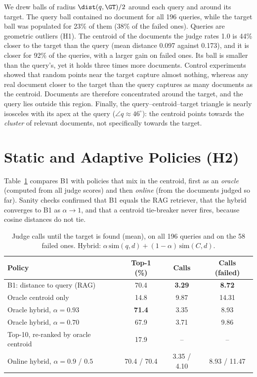 We drew balls of radius $\dist(q,\GT)/2$ around each query and around its target. The query ball contained no document for all 196 queries, while the target ball was populated for 23\% of them (38\% of the failed ones). Queries are geometric outliers (H1). The centroid of the documents the judge rates 1.0 is 44\% closer to the target than the query (mean distance 0.097 against 0.173), and it is closer for 92\% of the queries, with a larger gain on failed ones. Its ball is smaller than the query's, yet it holds three times more documents. Control experiments showed that random points near the target capture almost nothing, whereas any real document closer to the target than the query captures as many documents as the centroid. Documents are therefore concentrated around the target, and the query lies outside this region. Finally, the query--centroid--target triangle is nearly isosceles with its apex at the query ($\angle q\approx46^{\circ}$): the centroid points towards the \emph{cluster} of relevant documents, not specifically towards the target.

\section{Static and Adaptive Policies (H2)}
\label{sec:prelim-policies}

Table~\ref{tab:policies} compares B1 with policies that mix in the centroid, first as an \emph{oracle} (computed from all judge scores) and then \emph{online} (from the documents judged so far). Sanity checks confirmed that B1 equals the RAG retriever, that the hybrid converges to B1 as $\alpha\to1$, and that a centroid tie-breaker never fires, because cosine distances do not tie.

\begin{table}[htbp]
\centering
\caption{Judge calls until the target is found (mean), on all 196 queries and on the 58 failed ones. Hybrid: $\alpha\,\mathrm{sim}(q,d)+(1-\alpha)\,\mathrm{sim}(C,d)$.}
\label{tab:policies}
\small
\begin{tabular}{lccc}
\toprule
Policy & Top-1 (\%) & Calls & Calls (failed) \\
\midrule
B1: distance to query (RAG) & 70.4 & \textbf{3.29} & \textbf{8.72} \\
Oracle centroid only & 14.8 & 9.87 & 14.31 \\
Oracle hybrid, $\alpha=0.93$ & \textbf{71.4} & 3.35 & 8.93 \\
Oracle hybrid, $\alpha=0.70$ & 67.9 & 3.71 & 9.86 \\
Top-10, re-ranked by oracle centroid & 17.9 & -- & -- \\
Online hybrid, $\alpha=0.9$ / $0.5$ & 70.4 / 70.4 & 3.35 / 4.10 & 8.93 / 11.47 \\
\bottomrule
\end{tabular}
\end{table}

